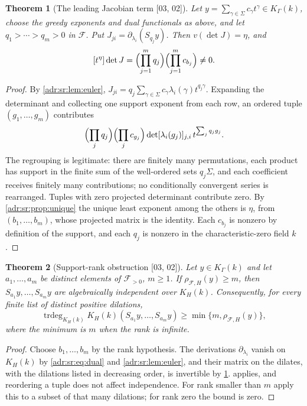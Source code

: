 \documentclass[11pt,letterpaper]{article}
\numberwithin{equation}{section}
\newtheorem{theorem}{Theorem}[section]
\theoremstyle{definition}
\theoremstyle{remark}
\newcommand{\K}{K_\Gamma(k)}
\newcommand{\trdeg}{\operatorname{trdeg}}
\newcommand{\src}[1]{\textup{[#1]}}%
\begin{document}
\begin{theorem}[The leading Jacobian term \src{03, 02}]
\label{adr:sr:thm:leading}
Let $y=\sum_{\gamma\in\Sigma}c_\gamma t^\gamma\in\K$, choose the greedy
exponents and dual functionals as above, and let $q_1>\cdots>q_m>0$ in
$\mathcal F$. Put $J_{ji}=\partial_{\lambda_i}(S_{q_j}y)$. Then
$v(\det J)=\eta$, and
\begin{equation}\label{adr:sr:eq:leading}
 [t^\eta]\det J=\Bigl(\prod_{j=1}^mq_j\Bigr)\Bigl(\prod_{j=1}^mc_{b_j}\Bigr)\ne0.
\end{equation}
\end{theorem}
\begin{proof}
By \cref{adr:sr:lem:euler}, $J_{ji}=q_j\sum_{\gamma\in\Sigma}c_\gamma
\lambda_i(\gamma)t^{q_j\gamma}$. Expanding the determinant and collecting one
support exponent from each row, an ordered tuple $(g_1,\ldots,g_m)$
contributes
\begin{equation}\label{adr:sr:eq:expansion}
 \Bigl(\prod_jq_j\Bigr)\Bigl(\prod_jc_{g_j}\Bigr)\det[\lambda_i(g_j)]_{j,i}\,
 t^{\sum_jq_jg_j}.
\end{equation}
The regrouping is legitimate: there are finitely many permutations, each
product has support in the finite sum of the well-ordered sets $q_j\Sigma$,
and each coefficient receives finitely many contributions; no conditionally
convergent series is rearranged. Tuples with zero projected determinant
contribute zero. By \cref{adr:sr:prop:unique} the unique least exponent among
the others is $\eta$, from $(b_1,\ldots,b_m)$, whose projected matrix is the
identity. Each $c_{b_j}$ is nonzero by definition of the support, and each
$q_j$ is nonzero in the characteristic-zero field $k$.
\end{proof}

\begin{theorem}[Support-rank obstruction \src{03, 02}]
\label{adr:sr:thm:main}
Let $y\in\K$ and let $a_1,\ldots,a_m$ be distinct elements of
$\mathcal F_{>0}$, $m\ge1$. If $\rho_{\mathcal F,H}(y)\ge m$, then
$S_{a_1}y,\ldots,S_{a_m}y$ are algebraically independent over $K_H(k)$.
Consequently, for every finite list of distinct positive dilations,
\begin{equation}\label{adr:sr:eq:lower}
 \trdeg_{K_H(k)}K_H(k)(S_{a_1}y,\ldots,S_{a_m}y)\ge\min\{m,\rho_{\mathcal F,H}(y)\},
\end{equation}
where the minimum is $m$ when the rank is infinite.
\end{theorem}
\begin{proof}
Choose $b_1,\ldots,b_m$ by the rank hypothesis. The derivations
$\partial_{\lambda_i}$ vanish on $K_H(k)$ by \eqref{adr:sr:eq:dual} and
\cref{adr:sr:lem:euler}, and their matrix on the dilates, with the dilations
listed in decreasing order, is invertible by \cref{adr:sr:thm:leading}.
 applies, and reordering a tuple does not affect
independence. For rank smaller than $m$ apply this to a subset of that many
dilations; for rank zero the bound is zero.
\end{proof}
\end{document}
